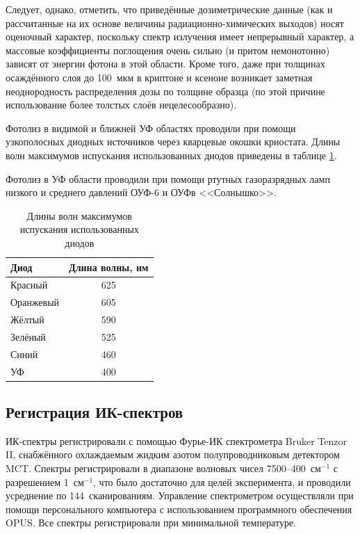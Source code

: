 Следует, однако, отметить, что приведённые дозиметрические данные (как и рассчитанные на их основе величины радиационно-химических выходов) 
носят оценочный характер, поскольку спектр излучения имеет непрерывный характер, а массовые коэффициенты поглощения очень сильно (и притом немонотонно)
 зависят от энергии фотона в этой области. Кроме того, даже при толщинах осаждённого слоя до 100~мкм в криптоне и ксеноне возникает заметная 
 неоднородность распределения дозы по толщине образца (по этой причине использование более толстых слоёв нецелесообразно).

Фотолиз в видимой и ближней УФ областях проводили при помощи узкополосных диодных источников через кварцевые окошки криостата. 
Длины волн максимумов испускания использованных диодов приведены в таблице \ref{diod}.

Фотолиз в УФ области проводили при помощи ртутных газоразрядных ламп низкого и среднего давлений
ОУФ-6  и ОУФв <<Солнышко>>.

\begin{table}[H]
\caption{Длины волн максимумов испускания использованных диодов}
\label{diod}
\begin{center}
\begin{tabular}{lc}
Диод & Длина волны, нм \\
\hline
Красный & 625 \\
Оранжевый & 605 \\
Жёлтый & 590 \\
Зелёный & 525 \\
Синий & 460 \\
УФ & 400 \\
\end{tabular}
\end{center}
\end{table}

\subsection{Регистрация ИК-спектров}
ИК-спектры регистрировали с помощью Фурье-ИК спектрометра Bruker Tenzor II, снабжённого охлаждаемым жидким азотом полупроводниковым детектором MCT.
Спектры регистрировали в диапазоне волновых чисел 7500--400~см$^{-1}$ с разрешением  
1~см$^{-1}$, что было достаточно для целей эксперимента, и проводили усреднение по 144~сканированиям. 
Управление спектрометром осуществляли при помощи персонального компьютера с использованием программного обеспечения OPUS. 
Все спектры регистрировали при минимальной температуре.
